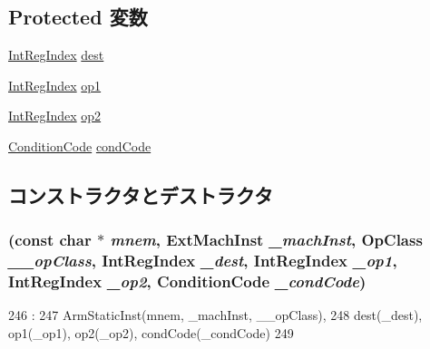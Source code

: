 \subsection*{Protected 変数}
\begin{DoxyCompactItemize}
\item 
\hyperlink{namespaceArmISA_ae64680ba9fb526106829d6bf92fc791b}{IntRegIndex} \hyperlink{classArmISA_1_1DataXCondSelOp_aec72e8e45bdc87abeeeb75d2a8a9a716}{dest}
\item 
\hyperlink{namespaceArmISA_ae64680ba9fb526106829d6bf92fc791b}{IntRegIndex} \hyperlink{classArmISA_1_1DataXCondSelOp_a4c465c43ad568f8bcf8ae71480e9cfea}{op1}
\item 
\hyperlink{namespaceArmISA_ae64680ba9fb526106829d6bf92fc791b}{IntRegIndex} \hyperlink{classArmISA_1_1DataXCondSelOp_a7799ff6cbe5a252199059eb8665820e7}{op2}
\item 
\hyperlink{namespaceArmISA_ab8f08e777c4753720cff841f81da8e06}{ConditionCode} \hyperlink{classArmISA_1_1DataXCondSelOp_a273dc0fe84de8f4a9cf52aaf8dc27885}{condCode}
\end{DoxyCompactItemize}


\subsection{コンストラクタとデストラクタ}
\hypertarget{classArmISA_1_1DataXCondSelOp_af533c5d8adf699d15cdfd20967e921d8}{
\subsubsection[{DataXCondSelOp}]{ (const char $\ast$ {\em mnem}, \/  {\bf ExtMachInst} {\em \_\-machInst}, \/  OpClass {\em \_\-\_\-opClass}, \/  {\bf IntRegIndex} {\em \_\-dest}, \/  {\bf IntRegIndex} {\em \_\-op1}, \/  {\bf IntRegIndex} {\em \_\-op2}, \/  {\bf ConditionCode} {\em \_\-condCode})}}
\label{classArmISA_1_1DataXCondSelOp_af533c5d8adf699d15cdfd20967e921d8}



\begin{DoxyCode}
246                                             :
247         ArmStaticInst(mnem, _machInst, __opClass),
248         dest(_dest), op1(_op1), op2(_op2), condCode(_condCode)
249     {}

\end{DoxyCode}


